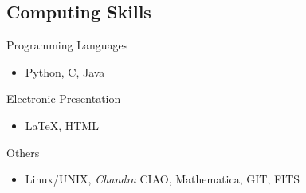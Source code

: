 \documentclass{res}
\begin{document}
\begin{resume}
\section{\textbf{Computing Skills}}
\vspace{.05in}
Programming Languages
\begin{itemize}
\item[] Python, C, Java
\end{itemize}
Electronic Presentation
\begin{itemize}
\item[] \LaTeX, HTML
\end{itemize}
Others
\begin{itemize}
\item[] Linux/UNIX, \textit{Chandra} CIAO, Mathematica, GIT, FITS
\end{itemize}

\end{resume} 
\end{document}
